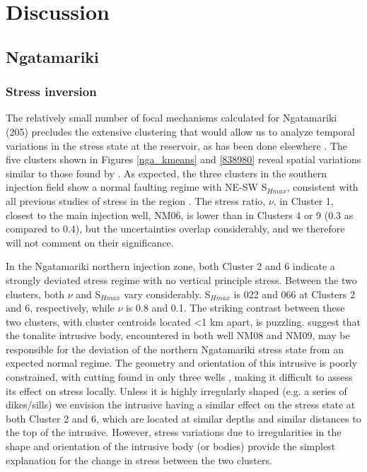 \section{Discussion}
\subsection{Ngatamariki}
\subsubsection{Stress inversion}\label{nga_stress_results}
The relatively small number of focal mechanisms calculated for Ngatamariki (205) precludes the extensive clustering that would allow us to analyze temporal variations in the stress state at the reservoir, as has been done elsewhere \citep[e.g.][]{Mart_nez_Garz_n_2013}. The five clusters shown in Figures \ref{nga_kmeans} and \ref{838980} reveal spatial variations similar to those found by \citep{j2019}. As expected, the three clusters in the southern injection field show a normal faulting regime with NE-SW S$_{Hmax}$, consistent with all previous studies of stress in the region \citep{hurst2002earthquake,hurst2008characteristics,Townend_2012}. The stress ratio, $\nu$, in Cluster 1, closest to the main injection well, NM06, is lower than in Clusters 4 or 9 (0.3 as compared to 0.4), but the uncertainties overlap considerably, and we therefore will not comment on their significance.

In the Ngatamariki northern injection zone, both Cluster 2 and 6 indicate a strongly deviated stress regime with no vertical principle stress. Between the two clusters, both $\nu$ and S$_{Hmax}$ vary considerably. S$_{Hmax}$ is 022\textdegree{} and 066\textdegree{} at Clusters 2 and 6, respectively, while $\nu$ is 0.8 and 0.1. The striking contrast between these two clusters, with cluster centroids located \textless{1} km apart, is puzzling. \citet{j2019} suggest that the tonalite intrusive body, encountered in both well NM08 and NM09, may be responsible for the deviation of the northern Ngatamariki stress state from an expected normal regime. The geometry and orientation of this intrusive is poorly constrained, with cutting found in only three wells \citep{Chambefort_2014}, making it difficult to assess its effect on stress locally. Unless it is highly irregularly shaped (e.g. a series of dikes/sills) we envision the intrusive having a similar effect on the stress state at both Cluster 2 and 6, which are located at similar depths and similar distances to the top of the intrusive. However, stress variations due to irregularities in the shape and orientation of the intrusive body (or bodies) provide the simplest explanation for the change in stress between the two clusters.

